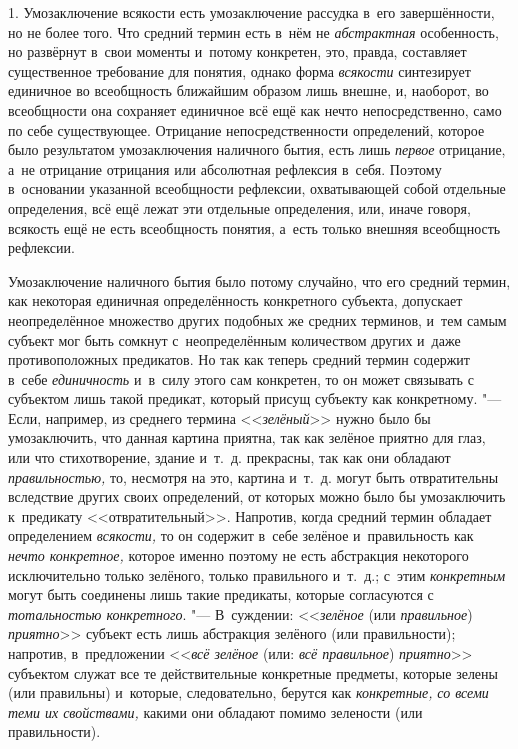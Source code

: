 1. Умозаключение всякости есть умозаключение рассудка в~его
завершённости, но не более того. Что средний термин есть в~нём не
{\em абстрактная}
особенность, но развёрнут в~свои моменты и~потому конкретен,
это, правда, составляет существенное требование для понятия, однако форма
{\em всякости}
синтезирует единичное во всеобщность ближайшим образом лишь
внешне, и, наоборот, во всеобщности она сохраняет единичное всё ещё как
нечто непосредственно, само по себе существующее. Отрицание
непосредственности определений, которое было результатом умозаключения
наличного бытия, есть лишь {\em первое}
отрицание, а~не отрицание отрицания или абсолютная рефлексия
в~себя. Поэтому в~основании указанной всеобщности рефлексии, охватывающей
собой отдельные определения, всё ещё лежат эти отдельные определения, или,
иначе говоря, всякость ещё не есть всеобщность понятия, а~есть только
внешняя всеобщность рефлексии.

Умозаключение наличного бытия было потому случайно, что его
средний термин, как некоторая единичная определённость конкретного
субъекта, допускает неопределённое множество других подобных же средних
терминов, и~тем самым субъект мог быть сомкнут с~неопределённым количеством
других и~даже противоположных предикатов. Но так как теперь средний термин
содержит в~себе {\em единичность}
и~в~силу этого сам конкретен, то он может связывать с
субъектом лишь такой предикат, который присущ субъекту как конкретному. "---
Если, например, из среднего термина
<<{\em зелёный}>> нужно
было бы умозаключить, что данная картина приятна, так как зелёное приятно
для глаз, или что стихотворение, здание и~т.~д. прекрасны, так как они
обладают {\em правильностью,}
то, несмотря на это, картина и~т.~д. могут быть отвратительны
вследствие других своих определений, от которых можно было бы умозаключить
к~предикату <<отвратительный>>. Напротив, когда средний термин обладает
определением {\em всякости,}
то он содержит в~себе зелёное и~правильность как
{\em нечто конкретное,}
которое именно поэтому не есть абстракция некоторого
исключительно только зелёного, только правильного и~т.~д.; с~этим
{\em конкретным} могут
быть соединены лишь такие предикаты, которые согласуются с
{\em тотальностью конкретного}. "---
В~суждении:
<<{\em зелёное} (или
{\em правильное})
{\em приятно}>> субъект
есть лишь абстракция зелёного (или правильности); напротив, в~предложении
<<{\em всё зелёное} (или:
{\em всё правильное})
{\em приятно}>> субъектом
служат все те действительные конкретные предметы, которые зелены (или
правильны) и~которые, следовательно, берутся как
{\em конкретные,}
{\em со всеми теми их свойствами,}
какими они обладают помимо зелености (или правильности).

